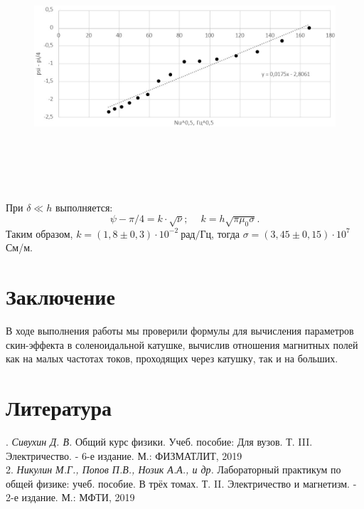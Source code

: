 \documentclass[14pt,a4paper]{article}
\begin{document}
\begin{figure}[H]
    \centering
    \includegraphics[width=18cm, height=9cm]{Pictures/graph3.jpg}
    \label{fig:scheme}
\end{figure}

При $\delta \ll h$ выполняется:
\begin{equation*}
    \psi - \pi/4 = k\cdot \sqrt{\nu}; \quad \ k = h\sqrt{\pi\mu_0\sigma}.
\end{equation*}
Таким образом, $k =  (1,8 \pm 0,3) \cdot 10^{-2} \ \text{рад/Гц}$, тогда $\sigma = (3,45 \pm 0,15) \cdot 10^7$ См/м.

\section*{Заключение}
В ходе выполнения работы мы проверили формулы для вычисления параметров скин-эффекта в соленоидальной катушке, вычислив отношения магнитных полей как на малых частотах токов, проходящих через катушку, так и на больших.

\section*{Литература}
. \textit{Сивухин Д. В.} Общий курс физики. Учеб. пособие: Для вузов. Т. III. Электричество. - 6-е издание. М.: ФИЗМАТЛИТ, 2019 \\
2. \textit{Никулин М.Г., Попов П.В., Нозик А.А., и др.} Лабораторный практикум по общей физике: учеб. пособие. В трёх томах. Т. II. Электричество и магнетизм. - 2-е издание. М.: МФТИ, 2019
\end{document}
